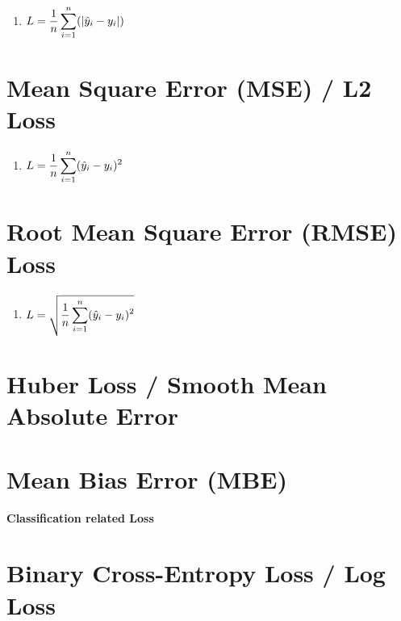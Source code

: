 \begin{enumerate}
    \item[]
    $
        L = \dfrac{1}{n} \displaystyle\sum_{i=1}^n (\left| \hat{y}_i - y_i \right|)
    $
    \hfill \cite{medium.com/analytics-vidhya/common-loss-functions-in-machine-learning-for-a-regression-model-27d2bbda9c93}
\end{enumerate}

\section{Mean Square Error (MSE) / L2 Loss}

\begin{enumerate}
    \item[]
    $
        L = \dfrac{1}{n} \displaystyle\sum_{i=1}^n (\hat{y}_i - y_i)^2
    $
    \hfill \cite{medium.com/analytics-vidhya/common-loss-functions-in-machine-learning-for-a-regression-model-27d2bbda9c93}
\end{enumerate}

\section{Root Mean Square Error (RMSE) Loss}

\begin{enumerate}
    \item[]
    $
        L = \sqrt{\dfrac{1}{n} \displaystyle\sum_{i=1}^n (\hat{y}_i - y_i)^2}
    $
    \hfill \cite{medium.com/analytics-vidhya/common-loss-functions-in-machine-learning-for-a-regression-model-27d2bbda9c93}
\end{enumerate}

\section{Huber Loss / Smooth Mean Absolute Error}


\section{Mean Bias Error (MBE)}



\clearpage
{\centering\fontsize{22}{22}\selectfont\bfseries Classification related Loss \par}
\vspace{0.5cm}


\section{Binary Cross-Entropy Loss / Log Loss}

